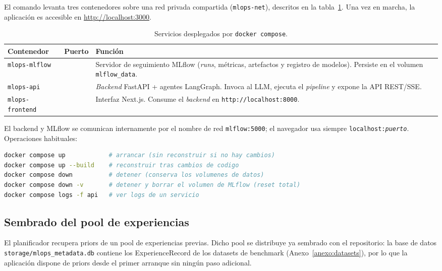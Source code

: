 \documentclass[12pt,a4paper]{article}
\theoremstyle{plain}
\begin{document}
El comando levanta tres contenedores sobre una red privada compartida
(\texttt{mlops-net}), descritos en la tabla~\ref{tab:repro-servicios}. Una vez en marcha,
la aplicación es accesible en \url{http://localhost:3000}.

\begin{table}[H]
\centering
\footnotesize
\setlength{\tabcolsep}{4pt}
\renewcommand{\arraystretch}{1.15}
\begin{tabularx}{\linewidth}{>{\RaggedRight\arraybackslash}p{3.6cm} >{\RaggedRight\arraybackslash}p{1.4cm} >{\RaggedRight\arraybackslash}X}
\hline
\textbf{Contenedor} & \textbf{Puerto} & \textbf{Función} \\\hline
\texttt{mlops-mlflow} & 5000 & Servidor de seguimiento MLflow (\textit{runs}, métricas, artefactos y registro de modelos). Persiste en el volumen \texttt{mlflow\_data}. \\\hline
\texttt{mlops-api} & 8000 & \textit{Backend} FastAPI + agentes LangGraph. Invoca al LLM, ejecuta el \textit{pipeline} y expone la API REST/SSE. \\\hline
\texttt{mlops-frontend} & 3000 & Interfaz Next.js. Consume el \textit{backend} en \texttt{http://localhost:8000}. \\\hline
\end{tabularx}
\caption{Servicios desplegados por \texttt{docker compose}.}
\label{tab:repro-servicios}
\end{table}

\noindent
El backend y MLflow se comunican internamente por el nombre de red
\texttt{mlflow:5000}; el navegador usa siempre \texttt{localhost:\textit{puerto}}.
Operaciones habituales:

\begin{lstlisting}[language=bash,breaklines=true,breakatwhitespace=true,columns=fullflexible]
docker compose up            # arrancar (sin reconstruir si no hay cambios)
docker compose up --build    # reconstruir tras cambios de codigo
docker compose down          # detener (conserva los volumenes de datos)
docker compose down -v       # detener y borrar el volumen de MLflow (reset total)
docker compose logs -f api   # ver logs de un servicio
\end{lstlisting}

\subsection{Sembrado del pool de experiencias}
\label{anexo:repro-pool}

El planificador recupera priors de un pool de experiencias previas. Dicho pool se distribuye ya sembrado con el repositorio: la base de datos \texttt{storage/mlops\_metadata.db} contiene los ExperienceRecord de los datasets de benchmark (Anexo~\ref{anexo:datasets}), por lo que la
aplicación dispone de priors desde el primer arranque sin ningún paso adicional.
\end{document}
